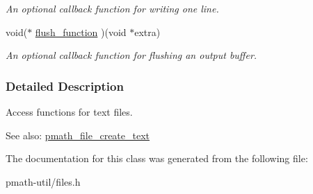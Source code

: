\begin{CompactItemize}
\begin{CompactList}\small\item\em An optional callback function for writing one line. \item\end{CompactList}\item 
\hypertarget{structpmath__text__file__api__t_0e96c902d44eb14261c432d787b9a50a}{
void($\ast$ \hyperlink{structpmath__text__file__api__t_0e96c902d44eb14261c432d787b9a50a}{flush\_\-function} )(void $\ast$extra)}
\label{structpmath__text__file__api__t_0e96c902d44eb14261c432d787b9a50a}

\begin{CompactList}\small\item\em An optional callback function for flushing an output buffer. \item\end{CompactList}\end{CompactItemize}


\subsubsection{Detailed Description}
Access functions for text files. 

\begin{Desc}
\item[See also:]\hyperlink{group__file__api_gb8a4394b083543a3e572862d567b4b63}{pmath\_\-file\_\-create\_\-text} \end{Desc}


The documentation for this class was generated from the following file:\begin{CompactItemize}
\item 
pmath-util/files.h\end{CompactItemize}
